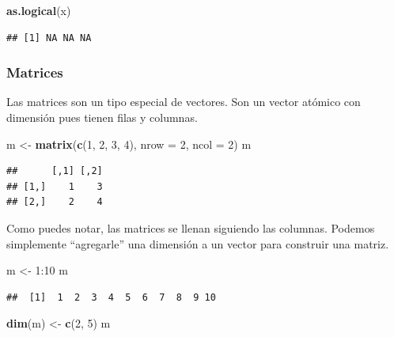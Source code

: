 \documentclass[]{article}
\newenvironment{Shaded}{\begin{snugshade}}{\end{snugshade}}
\newcommand{\KeywordTok}[1]{\textcolor[rgb]{0.13,0.29,0.53}{\textbf{{#1}}}}
\newcommand{\DataTypeTok}[1]{\textcolor[rgb]{0.13,0.29,0.53}{{#1}}}
\newcommand{\DecValTok}[1]{\textcolor[rgb]{0.00,0.00,0.81}{{#1}}}
\newcommand{\StringTok}[1]{\textcolor[rgb]{0.31,0.60,0.02}{{#1}}}
\newcommand{\NormalTok}[1]{{#1}}
\begin{document}
\begin{Shaded}
\begin{Highlighting}[]
\KeywordTok{as.logical}\NormalTok{(x)}
\end{Highlighting}
\end{Shaded}

\begin{verbatim}
## [1] NA NA NA
\end{verbatim}

\subsubsection{Matrices}\label{matrices}

Las matrices son un tipo especial de vectores. Son un vector atómico con
dimensión pues tienen filas y columnas.

\begin{Shaded}
\begin{Highlighting}[]
\NormalTok{m <-}\StringTok{ }\KeywordTok{matrix}\NormalTok{(}\KeywordTok{c}\NormalTok{(}\DecValTok{1}\NormalTok{, }\DecValTok{2}\NormalTok{, }\DecValTok{3}\NormalTok{, }\DecValTok{4}\NormalTok{), }\DataTypeTok{nrow =} \DecValTok{2}\NormalTok{, }\DataTypeTok{ncol =} \DecValTok{2}\NormalTok{)}
\NormalTok{m}
\end{Highlighting}
\end{Shaded}

\begin{verbatim}
##      [,1] [,2]
## [1,]    1    3
## [2,]    2    4
\end{verbatim}

Como puedes notar, las matrices se llenan siguiendo las columnas.
Podemos simplemente ``agregarle'' una dimensión a un vector para
construir una matriz.

\begin{Shaded}
\begin{Highlighting}[]
\NormalTok{m <-}\StringTok{ }\DecValTok{1}\NormalTok{:}\DecValTok{10}
\NormalTok{m}
\end{Highlighting}
\end{Shaded}

\begin{verbatim}
##  [1]  1  2  3  4  5  6  7  8  9 10
\end{verbatim}

\begin{Shaded}
\begin{Highlighting}[]
\KeywordTok{dim}\NormalTok{(m) <-}\StringTok{ }\KeywordTok{c}\NormalTok{(}\DecValTok{2}\NormalTok{, }\DecValTok{5}\NormalTok{)}
\NormalTok{m}
\end{Highlighting}
\end{Shaded}
\end{document}
